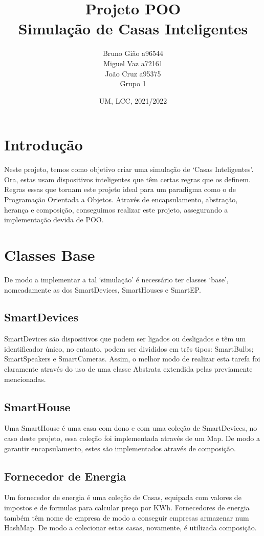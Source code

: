 \documentclass[10pt, a4paper]{article}
\title{Projeto POO\\
        Simulação de Casas Inteligentes}
\author{Bruno Gião a96544 \\ Miguel Vaz a72161 \\ João Cruz a95375 \\ Grupo 1}
\date{UM, LCC, 2021/2022}
\begin{document}
\maketitle

\newpage
\tableofcontents
\newpage

\section{Introdução}
        Neste projeto, temos como objetivo criar uma simulação de `Casas Inteligentes'.\@
        Ora, estas usam dispositivos inteligentes que têm certas regras que os definem. Regras essas que tornam este projeto ideal para um paradigma como
        o de Programação Orientada a Objetos.
        Através de encapsulamento, abstração, herança e composição, conseguimos realizar este projeto, assegurando a implementação devida de POO.\@
\section{Classes Base}
        De modo a implementar a tal `simulação' é necessário ter classes `base',
        nomeadamente as dos SmartDevices, SmartHouses e SmartEP.\@
\subsection{SmartDevices}
        SmartDevices são dispositivos que podem ser ligados ou desligados e têm um identificador único, no entanto, podem ser divididos em três tipos:
        SmartBulbs; SmartSpeakers e SmartCameras.
        Assim, o melhor modo de realizar esta tarefa foi claramente através do uso de uma classe Abstrata extendida pelas previamente mencionadas.
\subsection{SmartHouse}
        Uma SmartHouse é uma casa com dono e com uma coleção de SmartDevices, no caso deste projeto, essa coleção foi implementada através de um Map.
        De modo a garantir encapsulamento, estes são implementados através de composição.
\subsection{Fornecedor de Energia}
        Um fornecedor de energia é uma coleção de Casas, equipada com valores de impostos e de formulas para calcular preço por KWh.\@ 
        Fornecedores de energia também têm nome de empresa de modo a conseguir empresas armazenar num HashMap.
        De modo a colecionar estas casas, novamente, é utilizada composição.
\end{document}

